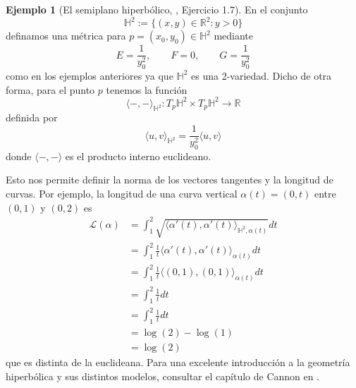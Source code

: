 \documentclass[spanish]{book}
\theoremstyle{definition}
\newtheorem*{ejem}{Ejemplo}
\newcommand{\R}{\mathbb{R}}
\newcommand{\Hy}{\mathbb{H}}
\begin{document}
	\begin{ejem}[El semiplano hiperbólico, \cite{seade}, \cite{Loring-dif} Ejercicio 1.7]
		En el conjunto
		\[\Hy^2:=\{(x,y)\in\R^2:y>0\}\]
		definamos una métrica para $p=(x_0,y_0)\in\Hy^2$ mediante
		\[E=\frac{1}{y^2_0},\qquad F=0,\qquad G=\frac{1}{y^2_0}\]
		como en los ejemplos anteriores ya que $\Hy^2$ es una 2-variedad. Dicho de otra forma, para el punto $p$ tenemos la función
		\[\langle-,-\rangle_{\Hy^2}:T_p\Hy^2\times T_p\Hy^2\to\R\]
		definida por
		\[\langle u,v\rangle_{\Hy^2}=\frac{1}{y_0^2}\langle u,v\rangle\]
		donde $\langle -,-\rangle$ es el producto interno euclideano.
		
		Esto nos permite definir la norma de los vectores tangentes y la longitud de curvas. Por ejemplo, la longitud de una curva vertical $\alpha(t)=(0,t)$ entre $(0,1)$ y $(0,2)$ es
		\begin{align*}
			\mathcal{L}(\alpha)&=\int_1^2\sqrt{\langle \alpha'(t),\alpha'(t)\rangle_{\Hy^2,\alpha(t)}}dt\\
			&=\int_1^2 \frac{1}{t}\langle \alpha'(t),\alpha'(t)\rangle_{\alpha(t)}dt\\
			&=\int_1^2\frac{1}{t}\langle (0,1),(0,1)\rangle_{\alpha(t)}dt\\
			&=\int_1^2\frac{1}{t}dt\\
			&=\int_1^2\frac{1}{t}dt\\
			&=\log(2)-\log(1)\\
			&=\log(2)
		\end{align*}
		que es distinta de la euclideana. Para una excelente introducción a la geometría hiperbólica y sus distintos modelos, consultar el capítulo de Cannon en \cite{flavors}.
	\end{ejem}
	
\end{document}

